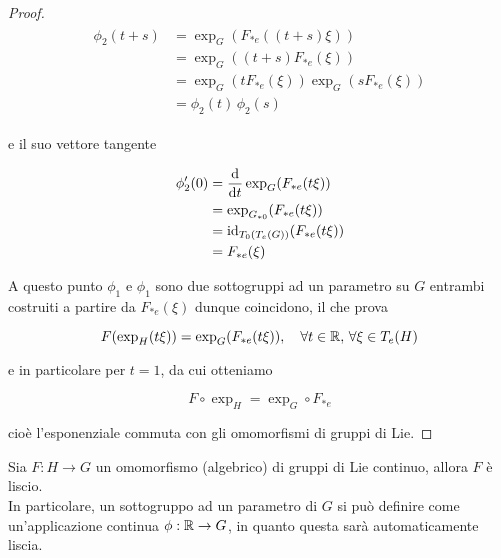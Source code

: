 \begin{proof}
	\begin{align}
		\begin{split}
			\phi_{2}(t+s) &= \exp_{G}(F_{*e}((t+s) \xi))\\
			&= \exp_{G}((t+s) F_{*e}(\xi))\\
			&= \exp_{G}(t F_{*e}(\xi)) \exp_{G}(s F_{*e}(\xi))\\
			&= \phi_{2}(t) \, \phi_{2}(s)
		\end{split}
	\end{align}

	e il suo vettore tangente
	
	\begin{align}
		\begin{split}
			\phi'_{2}(0) &= \dv{t} \exp_{G}(F_{*e}(t \xi))\\
			&= \exp_{G_{*0}} (F_{*e}(t \xi))\\
			&= \operatorname{id}_{T_{0}(T_{e}(G))} (F_{*e}(t \xi))\\
			&= F_{*e}(\xi)
		\end{split}
	\end{align}

	A questo punto $ \phi_{1} $ e $ \phi_{1} $ sono due sottogruppi ad un parametro su $ G $ entrambi costruiti a partire da $ F_{*e}(\xi) $ dunque coincidono, il che prova
	
	\begin{equation}
		F(\exp_{H}(t \xi)) = \exp_{G}(F_{*e}(t \xi)) \qcomma \forall t \in \R, \, \forall \xi \in T_{e}(H)
	\end{equation}

	e in particolare per $ t=1 $, da cui otteniamo
	
	\begin{equation}
		F \circ \exp_{H} = \exp_{G} \circ F_{*e}
	\end{equation}

	cioè l'esponenziale commuta con gli omomorfismi di gruppi di Lie.
\end{proof}

\begin{corollary}\label{om-cont-smooth}
	Sia $ F : H \to G $ un omomorfismo (algebrico) di gruppi di Lie continuo, allora $ F $ è liscio.\\
	In particolare, un sottogruppo ad un parametro di $ G $ si può definire come un'applicazione continua $ \phi : \mathbb{R} \to G $, in quanto questa sarà automaticamente liscia.
\end{corollary}

